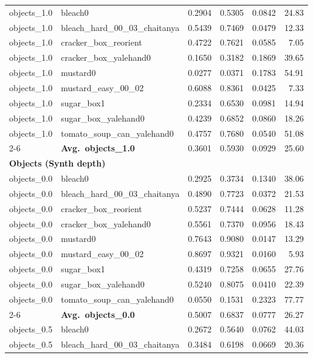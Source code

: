 \begin{longtable}{llrrrr}
  \midrule
  objects_1.0 & bleach0 & 0.2904 & 0.5305 & 0.0842 & 24.83 \\
  objects_1.0 & bleach\_hard\_00\_03\_chaitanya & 0.5439 & 0.7469 & 0.0479 & 12.33 \\
  objects_1.0 & cracker\_box\_reorient & 0.4722 & 0.7621 & 0.0585 & 7.05 \\
  objects_1.0 & cracker\_box\_yalehand0 & 0.1650 & 0.3182 & 0.1869 & 39.65 \\
  objects_1.0 & mustard0 & 0.0277 & 0.0371 & 0.1783 & 54.91 \\
  objects_1.0 & mustard\_easy\_00\_02 & 0.6088 & 0.8361 & 0.0425 & 7.33 \\
  objects_1.0 & sugar\_box1 & 0.2334 & 0.6530 & 0.0981 & 14.94 \\
  objects_1.0 & sugar\_box\_yalehand0 & 0.4239 & 0.6852 & 0.0860 & 18.26 \\
  objects_1.0 & tomato\_soup\_can\_yalehand0 & 0.4757 & 0.7680 & 0.0540 & 51.08 \\
  \cmidrule{2-6}
  & \textbf{Avg.~objects_1.0} & 0.3601 & 0.5930 & 0.0929 & 25.60 \\
  \midrule
\multicolumn{6}{l}{\textbf{Objects (Synth depth)}} \\
\midrule
  objects_0.0 & bleach0 & 0.2925 & 0.3734 & 0.1340 & 38.06 \\
  objects_0.0 & bleach\_hard\_00\_03\_chaitanya & 0.4890 & 0.7723 & 0.0372 & 21.53 \\
  objects_0.0 & cracker\_box\_reorient & 0.5237 & 0.7444 & 0.0628 & 11.28 \\
  objects_0.0 & cracker\_box\_yalehand0 & 0.5561 & 0.7370 & 0.0956 & 18.43 \\
  objects_0.0 & mustard0 & 0.7643 & 0.9080 & 0.0147 & 13.29 \\
  objects_0.0 & mustard\_easy\_00\_02 & 0.8697 & 0.9321 & 0.0160 & 5.93 \\
  objects_0.0 & sugar\_box1 & 0.4319 & 0.7258 & 0.0655 & 27.76 \\
  objects_0.0 & sugar\_box\_yalehand0 & 0.5240 & 0.8075 & 0.0410 & 22.39 \\
  objects_0.0 & tomato\_soup\_can\_yalehand0 & 0.0550 & 0.1531 & 0.2323 & 77.77 \\
  \cmidrule{2-6}
  & \textbf{Avg.~objects_0.0} & 0.5007 & 0.6837 & 0.0777 & 26.27 \\
  \midrule
  objects_0.5 & bleach0 & 0.2672 & 0.5640 & 0.0762 & 44.03 \\
  objects_0.5 & bleach\_hard\_00\_03\_chaitanya & 0.3484 & 0.6198 & 0.0669 & 20.36 \\

\end{longtable}
